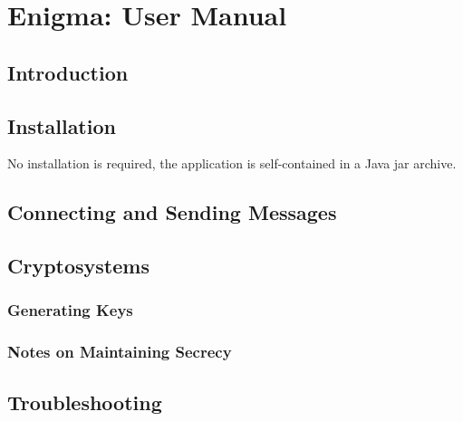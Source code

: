 
\chapter{Enigma: User Manual}
\label{AppendixD}

\section{Introduction}

\section{Installation}

No installation is required, the application is self-contained in a Java jar archive. 

\section{Connecting and Sending Messages}

\section{Cryptosystems}

  \subsection{Generating Keys}

  \subsection{Notes on Maintaining Secrecy}
  
\section{Troubleshooting}